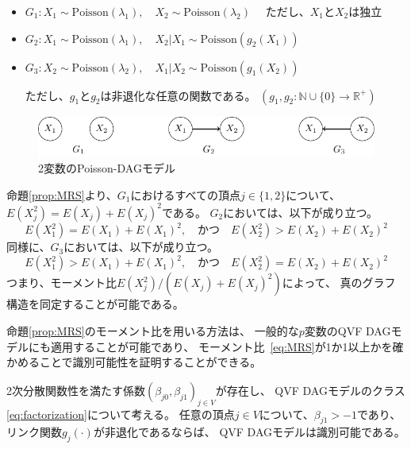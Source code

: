 \begin{itemize}
  \item $G_1 \colon X_1 \sim \mathrm{Poisson}(\lambda_1),
         \quad X_2 \sim \mathrm{Poisson}(\lambda_2) \quad$ ただし、$X_1$と$X_2$は独立

  \item $G_2 \colon X_1 \sim \mathrm{Poisson}(\lambda_1),
         \quad X_2|X_1 \sim \mathrm{Poisson}(g_2(X_1))$

  \item $G_3 \colon X_2 \sim \mathrm{Poisson}(\lambda_2),
         \quad X_1|X_2 \sim \mathrm{Poisson}(g_1(X_2))$

  ただし、$g_1$と$g_2$は非退化な任意の関数である。
  $(g_1, g_2 \colon \mathbb{N} \cup \{ 0 \} \rightarrow \mathbb{R}^+)$
\end{itemize}

\begin{figure}[h]
  \centering
  \includegraphics{./picture/bivariate.pdf}
  \caption{2変数のPoisson-DAGモデル}
  \label{fig:ex_bivariate}
\end{figure}

命題\ref{prop:MRS}より、$G_1$におけるすべての頂点$j \in \{ 1,2 \}$について、
$E(X_j^2) = E(X_j) + E(X_j)^2$である。
$G_2$においては、以下が成り立つ。
\begin{equation*}
  E(X_1^2) = E(X_1) + E(X_1)^2, \quad \text{かつ} \quad
  E(X_2^2) > E(X_2) + E(X_2)^2
\end{equation*}
同様に、$G_3$においては、以下が成り立つ。
\begin{equation*}
  E(X_1^2) > E(X_1) + E(X_1)^2, \quad \text{かつ} \quad
  E(X_2^2) = E(X_2) + E(X_2)^2
\end{equation*}
つまり、モーメント比$E(X_j^2) / (E(X_j) + E(X_j)^2)$によって、
真のグラフ構造を同定することが可能である。

命題\ref{prop:MRS}のモーメント比を用いる方法は、
一般的な$p$変数のQVF DAGモデルにも適用することが可能であり、
モーメント比~\eqref{eq:MRS}が1か1以上かを確かめることで識別可能性を証明することができる。

\begin{theo}
  2次分散関数性を満たす係数$(\beta_{j0}, \beta_{j1})_{j \in V}$が存在し、
  QVF DAGモデルのクラス\eqref{eq:factorization}について考える。
  任意の頂点$j \in V$について、$\beta_{j1} > -1$であり、
  リンク関数$g_j(\cdot)$が非退化であるならば、
  QVF DAGモデルは識別可能である。
\end{theo}

